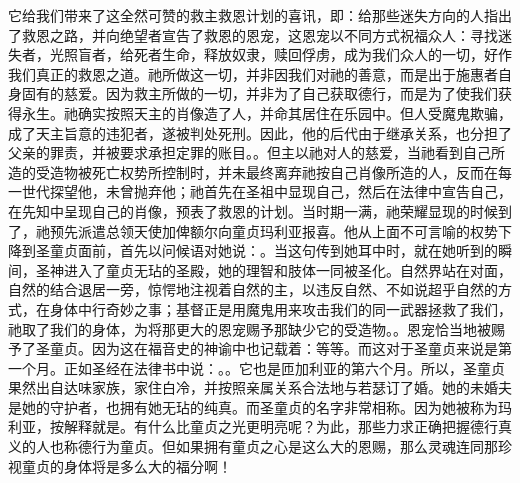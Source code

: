 它给我们带来了这全然可赞的救主救恩计划的喜讯，即：给那些迷失方向的人指出了救恩之路，并向绝望者宣告了救恩的恩宠，这恩宠以不同方式祝福众人：寻找迷失者，光照盲者，给死者生命，释放奴隶，赎回俘虏，成为我们众人的一切，好作我们真正的救恩之道。祂所做这一切，并非因我们对祂的善意，而是出于施惠者自身固有的慈爱。因为救主所做的一切，并非为了自己获取德行，而是为了使我们获得永生。祂确实按照天主的肖像造了人，并命其居住在乐园中。但人受魔鬼欺骗，成了天主旨意的违犯者，遂被判处死刑。因此，他的后代由于继承关系，也分担了父亲的罪责，并被要求承担定罪的账目。。但主以祂对人的慈爱，当祂看到自己所造的受造物被死亡权势所控制时，并未最终离弃祂按自己肖像所造的人，反而在每一世代探望他，未曾抛弃他；祂首先在圣祖中显现自己，然后在法律中宣告自己，在先知中呈现自己的肖像，预表了救恩的计划。当时期一满，祂荣耀显现的时候到了，祂预先派遣总领天使加俾额尔向童贞玛利亚报喜。他从上面不可言喻的权势下降到圣童贞面前，首先以问候语对她说：。当这句传到她耳中时，就在她听到的瞬间，圣神进入了童贞无玷的圣殿，她的理智和肢体一同被圣化。自然界站在对面，自然的结合退居一旁，惊愕地注视着自然的主，以违反自然、不如说超乎自然的方式，在身体中行奇妙之事；基督正是用魔鬼用来攻击我们的同一武器拯救了我们，祂取了我们的身体，为将那更大的恩宠赐予那缺少它的受造物。。恩宠恰当地被赐予了圣童贞。因为这在福音史的神谕中也记载着：等等。而这对于圣童贞来说是第一个月。正如圣经在法律书中说：。。它也是匝加利亚的第六个月。所以，圣童贞果然出自达味家族，家住白冷，并按照亲属关系合法地与若瑟订了婚。她的未婚夫是她的守护者，也拥有她无玷的纯真。而圣童贞的名字非常相称。因为她被称为玛利亚，按解释就是。有什么比童贞之光更明亮呢？为此，那些力求正确把握德行真义的人也称德行为童贞。但如果拥有童贞之心是这么大的恩赐，那么灵魂连同那珍视童贞的身体将是多么大的福分啊！\par


